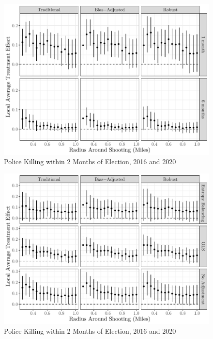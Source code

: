 \documentclass[
  12pt,
]{article}
\begin{document}
\begin{figure}[h]

{\centering \includegraphics{shoot_to_files/figure-latex/bws-4-1} 

}

\caption{\label{fig:map}Police Killing within 2 Months of Election, 2016 and 2020}\label{fig:bws-4}
\end{figure}

\begin{figure}[h]

{\centering \includegraphics{shoot_to_files/figure-latex/alt-proc-1} 

}

\caption{\label{fig:map}Police Killing within 2 Months of Election, 2016 and 2020}\label{fig:alt-proc}
\end{figure}
\end{document}
